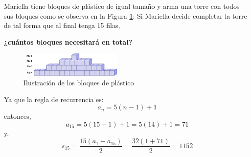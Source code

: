 Mariella tiene bloques de plástico de igual tamaño y arma una torre con todos sus bloques como se observa en la Figura \ref{fig:bloques_plastico}:
Si Mariella decide completar la torre de tal forma que al final tenga 15 filas,

\textbf{¿cuántos bloques necesitará en total?}\\

\begin{figure}[H]
    \centering
    \includegraphics[width=0.45\textwidth]{../images/57c79607ac0a75446759bf7de89522cf0cbcea57}
    \caption{Ilustración de los bloques de plástico}
    \label{fig:bloques_plastico}
\end{figure}


\begin{solutionbox}{4cm}
    Ya que la regla de recurrencia es:
    \[a_n=5(n-1)+1\]
    entonces,
    \[a_{15}=5(15-1)+1=5(14)+1=71\]
    y,
    \[s_{15}=\dfrac{15(a_1+a_{15})}{2}=\dfrac{32(1+71)}{2}=1152\]
\end{solutionbox}
